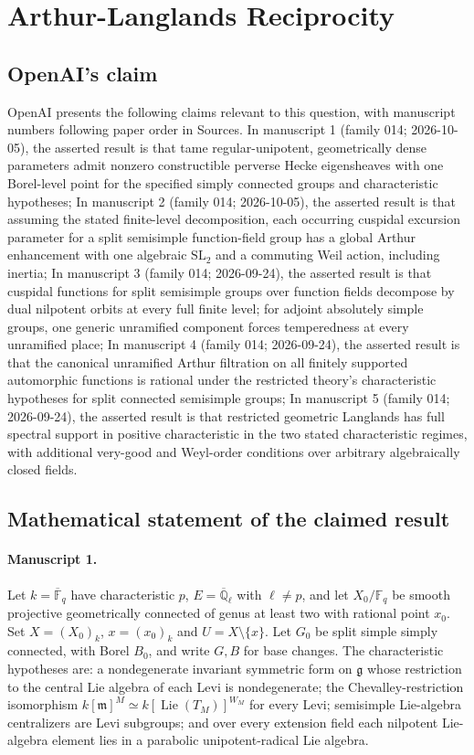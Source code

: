 \documentclass[11pt]{article}
\begin{document}
\section*{Arthur-Langlands Reciprocity}

\subsection{OpenAI's claim}
OpenAI presents the following claims relevant to this question, with manuscript numbers following paper order in Sources. In manuscript 1 (family 014; 2026-10-05), the asserted result is that tame regular-unipotent, geometrically dense parameters admit nonzero constructible perverse Hecke eigensheaves with one Borel-level point for the specified simply connected groups and characteristic hypotheses; In manuscript 2 (family 014; 2026-10-05), the asserted result is that assuming the stated finite-level decomposition, each occurring cuspidal excursion parameter for a split semisimple function-field group has a global Arthur enhancement with one algebraic $\mathrm{SL}_2$ and a commuting Weil action, including inertia; In manuscript 3 (family 014; 2026-09-24), the asserted result is that cuspidal functions for split semisimple groups over function fields decompose by dual nilpotent orbits at every full finite level; for adjoint absolutely simple groups, one generic unramified component forces temperedness at every unramified place; In manuscript 4 (family 014; 2026-09-24), the asserted result is that the canonical unramified Arthur filtration on all finitely supported automorphic functions is rational under the restricted theory's characteristic hypotheses for split connected semisimple groups; In manuscript 5 (family 014; 2026-09-24), the asserted result is that restricted geometric Langlands has full spectral support in positive characteristic in the two stated characteristic regimes, with additional very-good and Weyl-order conditions over arbitrary algebraically closed fields.

\subsection{Mathematical statement of the claimed result}
\paragraph{Manuscript 1.}
Let $k=\overline{\mathbb F}_q$ have characteristic $p$, $E=\overline{\mathbb Q}_{\ell}$ with $\ell\ne p$, and let $X_0/\mathbb F_q$ be smooth projective geometrically connected of genus at least two with rational point $x_0$. Set $X=(X_0)_k$, $x=(x_0)_k$ and $U=X\setminus\{x\}$. Let $G_0$ be split simple simply connected, with Borel $B_0$, and write $G,B$ for base changes. The characteristic hypotheses are: a nondegenerate invariant symmetric form on $\mathfrak g$ whose restriction to the central Lie algebra of each Levi is nondegenerate; the Chevalley-restriction isomorphism $k[\mathfrak m]^M\simeq k[\operatorname{Lie}(T_M)]^{W_M}$ for every Levi; semisimple Lie-algebra centralizers are Levi subgroups; and over every extension field each nilpotent Lie-algebra element lies in a parabolic unipotent-radical Lie algebra.
\end{document}
